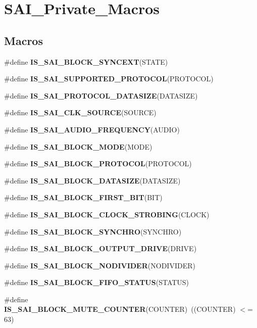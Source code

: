\hypertarget{group___s_a_i___private___macros}{}\section{S\+A\+I\+\_\+\+Private\+\_\+\+Macros}
\label{group___s_a_i___private___macros}
\subsection*{Macros}
\begin{DoxyCompactItemize}
\item 
\#define {\bfseries I\+S\+\_\+\+S\+A\+I\+\_\+\+B\+L\+O\+C\+K\+\_\+\+S\+Y\+N\+C\+E\+XT}(S\+T\+A\+TE)
\item 
\#define {\bfseries I\+S\+\_\+\+S\+A\+I\+\_\+\+S\+U\+P\+P\+O\+R\+T\+E\+D\+\_\+\+P\+R\+O\+T\+O\+C\+OL}(P\+R\+O\+T\+O\+C\+OL)
\item 
\#define {\bfseries I\+S\+\_\+\+S\+A\+I\+\_\+\+P\+R\+O\+T\+O\+C\+O\+L\+\_\+\+D\+A\+T\+A\+S\+I\+ZE}(D\+A\+T\+A\+S\+I\+ZE)
\item 
\#define {\bfseries I\+S\+\_\+\+S\+A\+I\+\_\+\+C\+L\+K\+\_\+\+S\+O\+U\+R\+CE}(S\+O\+U\+R\+CE)
\item 
\#define {\bfseries I\+S\+\_\+\+S\+A\+I\+\_\+\+A\+U\+D\+I\+O\+\_\+\+F\+R\+E\+Q\+U\+E\+N\+CY}(A\+U\+D\+IO)
\item 
\#define {\bfseries I\+S\+\_\+\+S\+A\+I\+\_\+\+B\+L\+O\+C\+K\+\_\+\+M\+O\+DE}(M\+O\+DE)
\item 
\#define {\bfseries I\+S\+\_\+\+S\+A\+I\+\_\+\+B\+L\+O\+C\+K\+\_\+\+P\+R\+O\+T\+O\+C\+OL}(P\+R\+O\+T\+O\+C\+OL)
\item 
\#define {\bfseries I\+S\+\_\+\+S\+A\+I\+\_\+\+B\+L\+O\+C\+K\+\_\+\+D\+A\+T\+A\+S\+I\+ZE}(D\+A\+T\+A\+S\+I\+ZE)
\item 
\#define {\bfseries I\+S\+\_\+\+S\+A\+I\+\_\+\+B\+L\+O\+C\+K\+\_\+\+F\+I\+R\+S\+T\+\_\+\+B\+IT}(B\+IT)
\item 
\#define {\bfseries I\+S\+\_\+\+S\+A\+I\+\_\+\+B\+L\+O\+C\+K\+\_\+\+C\+L\+O\+C\+K\+\_\+\+S\+T\+R\+O\+B\+I\+NG}(C\+L\+O\+CK)
\item 
\#define {\bfseries I\+S\+\_\+\+S\+A\+I\+\_\+\+B\+L\+O\+C\+K\+\_\+\+S\+Y\+N\+C\+H\+RO}(S\+Y\+N\+C\+H\+RO)
\item 
\#define {\bfseries I\+S\+\_\+\+S\+A\+I\+\_\+\+B\+L\+O\+C\+K\+\_\+\+O\+U\+T\+P\+U\+T\+\_\+\+D\+R\+I\+VE}(D\+R\+I\+VE)
\item 
\#define {\bfseries I\+S\+\_\+\+S\+A\+I\+\_\+\+B\+L\+O\+C\+K\+\_\+\+N\+O\+D\+I\+V\+I\+D\+ER}(N\+O\+D\+I\+V\+I\+D\+ER)
\item 
\#define {\bfseries I\+S\+\_\+\+S\+A\+I\+\_\+\+B\+L\+O\+C\+K\+\_\+\+F\+I\+F\+O\+\_\+\+S\+T\+A\+T\+US}(S\+T\+A\+T\+US)
\item 
\#define {\bfseries I\+S\+\_\+\+S\+A\+I\+\_\+\+B\+L\+O\+C\+K\+\_\+\+M\+U\+T\+E\+\_\+\+C\+O\+U\+N\+T\+ER}(C\+O\+U\+N\+T\+ER)~((C\+O\+U\+N\+T\+ER) $<$= 63)\hypertarget{group___s_a_i___private___macros_ga1117d1451f58293f6e2243b6b8bdbadd}{}\label{group___s_a_i___private___macros_ga1117d1451f58293f6e2243b6b8bdbadd}


\end{DoxyCompactItemize}
